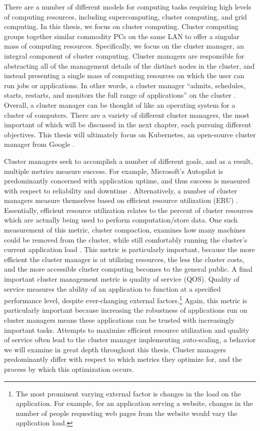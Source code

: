 There are a number of different models for computing tasks requiring high levels
of computing resources, including supercomputing, cluster computing, and grid
computing. In this thesis, we focus on cluster computing. Cluster computing
groups together similar commodity PCs on the same LAN to offer a singular mass
of computing resources. Specifically, we focus on the
cluster manager, an integral component of cluster computing. Cluster managers
are responsible for abstracting all of the management details of the distinct
nodes in the cluster, and instead presenting a single mass of computing resources
on which the user can run jobs or applications. In other words,
a cluster manager ``admits, schedules, starts, restarts, and monitors the full
range of applications'' on the cluster \cite{borg}. Overall, a cluster
manager can be thought of like an operating system for a cluster of computers. There are a
variety of different cluster managers, the most important of which will be
discussed in the next chapter, each pursuing different objectives. This
thesis will ultimately focus on Kubernetes, an open-source cluster
manager from Google \cite{k8s-website}.

Cluster managers seek to accomplish a number of different goals, and as a
result, multiple metrics measure success. For example, Microsoft's Autopilot is
predominantly concerned with application uptime, and thus success is measured
with respect to reliability and downtime \cite{autopilot}.
Alternatively, a number of cluster managers measure themselves based on
efficient resource utilization (ERU) \cite{borg}. Essentially, efficient
resource utilization relates to the percent of cluster resources which are
actually being used to perform computation/store data.
One such measurement of this metric, cluster
compaction, examines how many machines could be removed from the cluster, while
still comfortably running the cluster's current application load
\cite{evaluating-job-packing-in-warehouse-scale-computing}. This metric is
particularly important, because the more efficient the cluster manager is at
utilizing resources, the less the cluster costs, and the more accessible cluster
computing becomes to the general public. A final important
cluster management metric is quality of service (QOS). Quality of service measures the
ability of an application to function at a specified
performance level, despite ever-changing
external factors.\footnote{The most prominent varying external factor is changes
in the load on the application. For example, for an application serving a
website, changes in the number of people requesting web pages from the website
would vary the application load.} Again, this metric is particularly important because
increasing the robustness of applications run on cluster managers means
these applications can be trusted with increasingly important tasks. Attempts to
maximize efficient resource utilization and quality of service
often lead to the cluster manager implementing
auto-scaling, a behavior we will examine in great depth throughout this thesis. Cluster
managers predominantly differ with respect to which metrics they optimize
for, and the process by which this optimization occurs.

